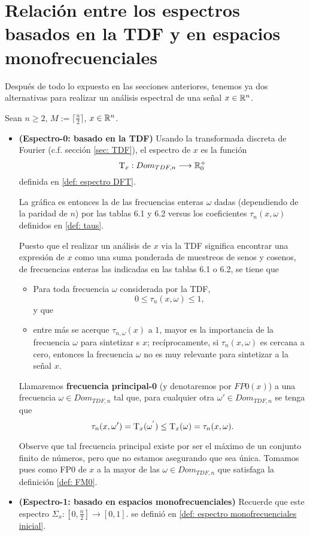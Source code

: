 \section{Relación entre los espectros basados en la TDF y en espacios monofrecuenciales}

Después de todo lo expuesto en las secciones anteriores, tenemos
ya dos alternativas para realizar un análisis
espectral de una señal $x \in \mathbb{R}^{n}$.

Sean $n \geq 2$, $M := \lceil \frac{n}{2} \rceil$, $x \in \mathbb{R}^{n}$.
\begin{itemize}
	\item \textbf{(Espectro-0: basado en la TDF)} 
	Usando la transformada discreta de Fourier
	(c.f. sección \ref{sec: TDF}),
	el espectro de $x$ es la función
	\[
	\mathrm{T}_{x}: Dom_{TDF, n} \longrightarrow \mathbb{R}^{+}_{0}
	\]	
	definida en \ref{def: espectro DFT}.
	
	La gráfica es entonces la de las frecuencias
	enteras $\omega$ dadas (dependiendo de la 
	paridad de $n$) por las
	tablas 6.1 y 6.2
	versus los coeficientes
	$\tau_{n}(x, \omega)$ definidos en
	\ref{def: taus}.
	
	Puesto que el realizar un análisis de 
	$x$ via la TDF significa encontrar una
	expresión de $x$ como una suma
	ponderada de muestreos de senos y cosenos,
	de frecuencias enteras las indicadas en las tablas 6.1 o 6.2,
	se tiene que  
	\begin{itemize}
		\item Para toda frecuencia $\omega$ considerada
		por la TDF,
		\[
		0 \leq \tau_{n}(x, \omega) \leq 1,
		\]
		y que
		\item entre más se acerque
		$\tau_{n, \omega}(x)$
		a $1$, mayor es la
		importancia de la frecuencia $\omega$ para
		sintetizar s $x$; recíprocamente, si 
		$\tau_{n}(x, \omega)$ es cercana a cero, entonces
		la frecuencia $\omega$ no es muy relevante para 
		sintetizar a la señal $x$.
	\end{itemize}
	\begin{defi}
	\label{def: FM0}
	Llamaremos \textbf{frecuencia principal-0}
	(y denotaremos por $FP0(x)$) 
	a una 
	frecuencia $\omega \in Dom_{TDF, n}$
	tal que, para cualquier otra $\omega' \in Dom_{TDF, n}$ 
	se tenga que 
	\[
	\tau_{n}(x, \omega') = \mathrm{T}_{x}(\omega^{'}) \leq
	\mathrm{T}_{x}(\omega) =  
	 \tau_{n}(x, \omega).
	\]
	\end{defi}
	Observe que tal frecuencia principal existe por ser 
	el máximo de un conjunto finito de números, pero que no 
	estamos asegurando que sea única. Tomamos pues
	como FP0 de $x$ a la mayor de las $\omega \in Dom_{TDF, n}$ 
	que satisfaga la definición \ref{def: FM0}.
	\item \textbf{(Espectro-1: basado en espacios monofrecuenciales)} 
	Recuerde que este espectro 
	$
	\Sigma_{x} : \left[0, \frac{n}{2} \right] \longrightarrow [0,1].
	$
	se definió en \ref{def: espectro monofrecuenciales inicial}.
	

\end{itemize}
